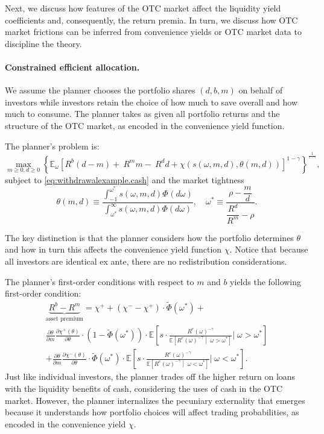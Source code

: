 \documentclass[12pt,american,english,notitlepage]{article}
\begin{document}
Next, we discuss how features of the OTC market affect the liquidity
yield coefficients and, consequently, the return premia. In turn,
we discuss how OTC market frictions can be inferred from convenience
yields or OTC market data to discipline the theory.

\paragraph{Constrained efficient allocation.}
We assume the planner chooses the portfolio shares $(d,b,m)$ on behalf of investors while investors retain the choice of how much to save overall and how much to consume. The planner takes as given all portfolio returns and the structure of the OTC market, as encoded in the convenience yield function. 

\begin{problem}The planner's problem is:
\[
\max_{m\ge0,d\geq0}\left\{ \mathbb{E}_{\omega}\left[R^{b}(d-m)+\ R^{m}m-\ R^{d}d+\chi\left(s\left(\omega,m,d\right),\theta(m,d)\right)\right]^{1-\gamma}\right\} ^{\frac{1}{^{1-\gamma}}},
\]
subject to \eqref{eq:withdrawalexample.cash} and the market tightness
\[
\theta\left(m,d\right)\equiv\frac{\int_{-1}^{\omega^{\ast}}s\left(\omega,m,d\right)\Phi^ {}(d\omega)}{\int_{\omega^{\ast}}^{\infty}s\left(\omega,m,d\right)\Phi(d\omega)},\quad\omega^{\ast}\equiv\frac{\rho-\dfrac{m}{d}}{\dfrac{R^{d}}{R^{m}}-\rho}.
\]

\end{problem}

The key distinction is that the planner considers how the portfolio
determines $\theta$ and how in turn this affects the convenience
yield function $\chi$. Notice that because all investors are identical ex ante, there are no redistribution considerations.


The planner's first-order conditions with
respect to $m$ and $b$ yields the following first-order condition:
\begin{multline}
\underbrace{R^{b}-R^{m}}_{\text{asset premium}}=\chi^{+}+\left(\chi^{-}-\chi^{+}\right)\cdot\tilde{\Phi}\left(\omega^{\ast}\right) + \\ 
\frac{\partial\theta}{\partial m}\frac{\partial\chi^{+}(\theta)}{\partial\theta}\cdot(1-\tilde{\Phi}(\omega^{\ast}))\cdot\mathbb{E}\left[s\cdot\frac{R^{e}(\omega)^{-\gamma}}{\mathbb{E}\left[R^{e}(\omega)^{-\gamma}\middle|\;\omega>\omega^{\ast}\right]}|\;\omega>\omega^{\ast}\right]\\[4pt]
  +\frac{\partial\theta}{\partial m}\frac{\partial\chi^{-}(\theta)}{\partial\theta}\cdot\tilde{\Phi}(\omega^{\ast})\cdot\mathbb{E}\left[s\cdot\frac{R^{e}(\omega)^{-\gamma}}{\mathbb{E}\left[R^{e}(\omega)^{-\gamma}\middle|\;\omega<\omega^{\ast}\right]}|\;\omega<\omega^{\ast}\right].
\end{multline}
Just like individual investors, the planner trades off the higher return on loans with the liquidity benefits of cash, considering the uses of cash in the OTC market. However, the planner internalizes the pecuniary externality that emerges because it understands how portfolio choices will affect trading probabilities, as encoded in the convenience yield $\chi$. 
\end{document}
